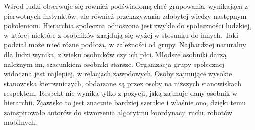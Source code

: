\documentclass{beamer}
\begin{document}
\begin{frame}
{	
Wśród ludzi obserwuje się również podświadomą chęć grupowania, wynikająca z pierwotnych instynktów, ale również przekazywania zdobytej wiedzy następnym pokoleniom. Hierarchia społeczna odnoszona jest zwykle do społeczności ludzkiej, w której niektóre z osobników znajdują się wyżej w stosunku do innych. Taki podział może mieć różne podłoża, w zależności od grupy. Najbardziej naturalny dla ludzi wynika, z wieku osobników czy ich płci. Młodsze osobniki darzą należnym im, szacunkiem osobniki starsze. Organizacja grupy społecznej widoczna jest najlepiej, w relacjach zawodowych. Osoby zajmujące wysokie stanowiska kierowniczych, obdarzane są przez osoby na niższych stanowiskach respektem. Respekt nie wynika tylko z pozycji, jaką zajmuje dany osobnik w hierarchii. Zjawisko to jest znacznie bardziej szerokie i właśnie ono, dzięki temu zainspirowało autorów do stworzenia algorytmu koordynacji ruchu robotów mobilnych.}

\end{frame}
\end{document}
